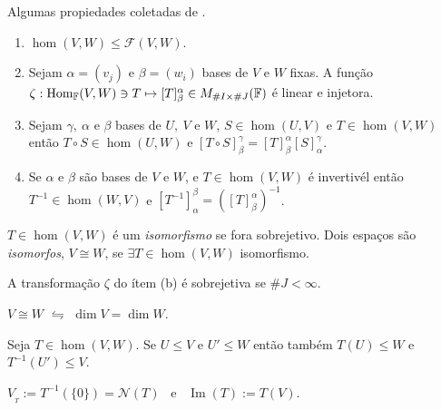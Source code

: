 \begin{proposition}
\label{prop:0.1}
    Algumas propiedades coletadas de \cite[Seç. 6.1]{MA719}. 
    \begin{enumerate}[left = 0.55cm, label = (\alph*)]
        \item \(\hom(V,W) \leq \mathcal{F}(V,W)\). 
        \item Sejam \(\alpha = (v_j)\) e \(\beta = (w_i) \) bases de \(V\) e \(W\) fixas. A função  \(\zeta : \operatorname{Hom}_{\mathbb{F}}(V,W) \ni T \mapsto [T]^\alpha_\beta \in M_{\#I \times \#J}(\mathbb{F}) \) é linear e injetora. 
        \item Sejam \(\gamma, \ \alpha\) e \(\beta\) bases de \(U,\ V\) e \(W\), \(S \in \hom(U,V)\) e \(T\in \hom(V,W)\) então \(T\circ S \in \hom(U,W)\) e \([T\circ S]^\gamma_\beta = [T]^\alpha_\beta [S]^\gamma_\alpha\).
        \item Se \(\alpha \) e \(\beta \) são bases de \(V\) e \(W\), e \(T \in \hom(V,W)\) é invertivél então \(T^{-1} \in \hom(W,V)\) e \([T^{-1}]^\beta_\alpha = ([T]^\alpha_\beta)^{-1}\).
    \end{enumerate}
\end{proposition}

\begin{definition}
    \(T\in \hom(V,W)\) é um \emph{isomorfismo} se fora sobrejetivo. Dois espaços são \emph{isomorfos}, \(V\cong W\), se \(\exists T\in \hom(V,W)\) isomorfismo.  
\end{definition}

\begin{note}
    A transformação \(\zeta\) do ítem (b) é sobrejetiva se \(\#J < \infty\).
\end{note}

\begin{theorem}
    \(V\cong W\) \(\leftrightharpoons\) \(\dim V = \dim W\). 
\end{theorem}

\propositionnum{\ \hspace{-0.3cm}}
\begin{proposition}
    Seja \(T\in \hom(V,W)\). Se \(U \leq V\) e \(U'\leq W\) então também \(T(U)\leq W\) e \(T^{-1}(U')\leq V\). 
\end{proposition}

\begin{definition}
    \centering 
    \(V_{_T} := T^{-1}(\{0\}) = \mathcal{N}(T)\) \  e \  \(\operatorname{Im}(T) := T(V)\). 
\end{definition}

